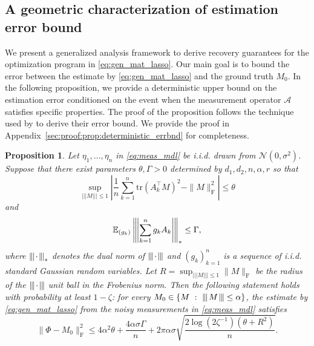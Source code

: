 \documentclass[11pt]{article}
\newtheorem{prop}[lemma]{Proposition}
\newcommand{\xspace}{\hbox{\kern-2.5pt}}
\newcommand\tnorm[1]{\left\vert\xspace\left\vert\xspace\left\vert\mskip2mu
#1\mskip2mu \right\vert\xspace\right\vert\xspace\right\vert}
\newcommand{\E}{\mathbb{E}}
\begin{document}
\subsection{A geometric characterization of estimation error bound}
We present a generalized analysis framework to derive recovery guarantees for the optimization program in \eqref{eq:gen_mat_lasso}. Our main goal is to bound the error between the estimate by \eqref{eq:gen_mat_lasso} and the ground truth $M_0$. 
In the following proposition, we provide a deterministic upper bound on the estimation error conditioned on the event when the measurement operator $\mathcal{A}$ satisfies specific properties. 
The proof of the proposition follows the technique used by \citet{cai2016matrix} to derive their error bound. We provide the proof in Appendix~\ref{sec:proof:prop:deterministic_errbnd} for completeness. 

\begin{prop}
	\label{prop:deterministic_errbnd}
	Let $\eta_1,\dots,\eta_n$ in \eqref{eq:meas_mdl} be i.i.d. drawn from $\mathcal{N}(0,\sigma^2)$. 
	Suppose that there exist parameters $\theta, \Gamma >0$ determined by $d_1,d_2,n,\alpha,r$ so that 
	\begin{equation}
		\label{eq:qub}
		\sup_{\vert\vert\vert M\vert\vert\vert \leq 1} \left| \frac{1}{n} \sum_{k=1}^n \mathrm{tr}(A_k^\top M )^2 - \| M \|_\mathrm{F}^2 \right| \leq \theta
	\end{equation}
	and
	\begin{equation}
		\label{eq:gaussian_complexity}
		\E_{(g_k)} \left\vert\xspace\left\vert\xspace\left\vert \sum_{k=1}^n g_{k} A_{k} \right\vert\xspace\right\vert\xspace\right\vert_{*} \leq \Gamma,
	\end{equation} 
	where $\tnorm{\cdot}_*$ denotes the dual norm of $\tnorm{\cdot}$ and $(g_k)_{k=1}^n$ is a sequence of i.i.d. standard Gaussian random variables.
	Let $R=\sup_{\vert\vert\vert M\vert\vert\vert\leq 1} \|M\|_{\mathrm{F}}$ be the radius of the $\tnorm{\cdot}$ unit ball in the Frobenius norm.
	Then the following statement holds with probability at least $1-\zeta$: for every $M_0 \in \{M~:~\tnorm{M}\leq\alpha\}$, the estimate by \eqref{eq:gen_mat_lasso} from the noisy measurements in \eqref{eq:meas_mdl} satisfies 
	\begin{equation}
		\label{eq:generic_upper_bound}
		\| \Phi - M_0\|_\mathrm{F}^2 \leq 4 \alpha^2 \theta + \frac{4\alpha\sigma  \Gamma}{n} + 2\pi \alpha \sigma \sqrt{\frac{2\log(2\zeta^{-1}) ( \theta + R^2)}{n}}.
	\end{equation} 
\end{prop}
\end{document}
